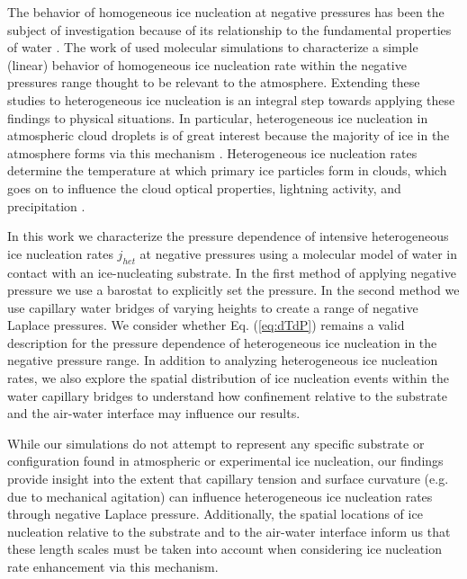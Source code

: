 \documentclass[journal abbreviation, manuscript]{copernicus}
\begin{document}
The behavior of homogeneous ice nucleation at negative pressures has been the subject of investigation because of its relationship to the fundamental properties of water \citep[e.g.,][]{bianco2021, lu2016anomaly}. The work of \citet{rosky2022} used molecular simulations to characterize a simple (linear) behavior of homogeneous ice nucleation rate within the negative pressures range thought to be relevant to the atmosphere. Extending these studies to heterogeneous ice nucleation is an integral step towards applying these findings to physical situations. In particular, heterogeneous ice nucleation in atmospheric cloud droplets is of great interest because the majority of ice in the atmosphere forms via this mechanism \citep{cantrell2005production,hoose2012heterogeneous}. Heterogeneous ice nucleation rates determine the temperature at which primary ice particles form in clouds, which goes on to influence the cloud optical properties, lightning activity, and precipitation \citep{lamb2011physics}. 

In this work we characterize the pressure dependence of intensive heterogeneous ice nucleation rates $j_{het}$ at negative pressures using a molecular model of water in contact with an ice-nucleating substrate. In the first method of applying negative pressure we use a barostat to explicitly set the pressure. In the second method we use capillary water bridges of varying heights to create a range of negative Laplace pressures. We consider whether Eq. (\ref{eq:dTdP}) remains a valid description for the pressure dependence of heterogeneous ice nucleation in the negative pressure range. In addition to analyzing heterogeneous ice nucleation rates, we also explore the spatial distribution of ice nucleation events within the water capillary bridges to understand how confinement relative to the substrate and the air-water interface may influence our results. %

While our simulations do not attempt to represent any specific substrate or configuration found in atmospheric or experimental ice nucleation, our findings provide insight into the extent that capillary tension and surface curvature (e.g. due to mechanical agitation) can influence heterogeneous ice nucleation rates through negative Laplace pressure.  Additionally, the spatial locations of ice nucleation relative to the substrate and to the air-water interface inform us that these length scales must be taken into account when considering ice nucleation rate enhancement via this mechanism.
\end{document}
